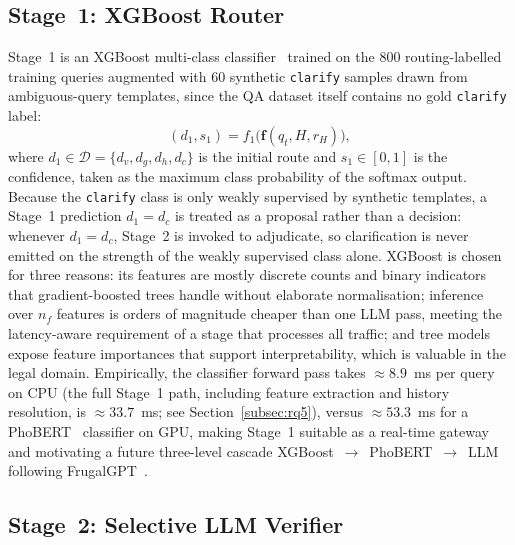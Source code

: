 \documentclass[pdflatex,sn-mathphys-num]{sn-jnl}
\begin{document}
\subsection{Stage~1: XGBoost Router}\label{subsec:stage1}

Stage~1 is an XGBoost multi-class classifier~\cite{chen2016xgboost} trained on
the $800$ routing-labelled training queries augmented with $60$ synthetic
\texttt{clarify} samples drawn from ambiguous-query templates, since the QA
dataset itself contains no gold \texttt{clarify} label:
\begin{equation}
(d_1,s_1) = f_1\bigl(\mathbf{f}(q_t,H,r_H)\bigr),
\label{eq:stage1}
\end{equation}
where $d_1\in\mathcal{D}=\{d_v,d_g,d_h,d_c\}$ is the initial route and
$s_1\in[0,1]$ is the confidence, taken as the maximum class probability of
the softmax output. Because the \texttt{clarify} class is only weakly
supervised by synthetic templates, a Stage~1 prediction $d_1=d_c$ is treated
as a proposal rather than a decision: whenever $d_1=d_c$, Stage~2 is invoked
to adjudicate, so clarification is never emitted on the strength of the
weakly supervised class alone.
XGBoost is chosen for three reasons: its
features are mostly discrete counts and binary indicators that
gradient-boosted trees handle without elaborate normalisation; inference over
$n_f$ features is orders of magnitude cheaper than one LLM pass, meeting the
latency-aware requirement of a stage that processes all traffic; and tree
models expose feature importances that support interpretability, which is
valuable in the legal domain. Empirically, the classifier forward pass takes
$\approx\!8.9$~ms per query on CPU (the full Stage~1 path, including feature
extraction and history resolution, is $\approx\!33.7$~ms; see
Section~\ref{subsec:rq5}), versus $\approx\!53.3$~ms for a
PhoBERT~\cite{nguyen2020phobert} classifier on GPU, making Stage~1 suitable as
a real-time gateway and motivating a future three-level cascade
XGBoost~$\rightarrow$~PhoBERT~$\rightarrow$~LLM following
FrugalGPT~\cite{chen2023frugalgpt}.

\subsection{Stage~2: Selective LLM Verifier}\label{subsec:stage2}
\end{document}
